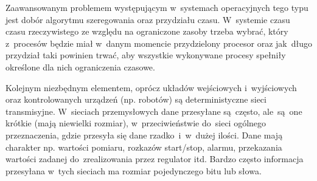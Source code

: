 Zaawansowanym problemem występującym w~systemach operacyjnych tego typu jest dobór algorytmu szeregowania oraz przydziału czasu. W~systemie czasu czasu rzeczywistego ze względu na ograniczone zasoby trzeba wybrać, który z~procesów będzie miał w~danym momencie przydzielony procesor oraz jak~długo przydział taki powinien trwać, aby wszystkie wykonywane procesy spełniły określone dla nich ograniczenia czasowe.


Kolejnym niezbędnym elementem, oprócz układów wejściowych i~wyjściowych oraz kontrolowanych urządzeń (np. robotów) są deterministyczne sieci transmisyjne.
W~sieciach przemysłowych dane przesyłane są~często, ale~są~one krótkie (mają niewielki rozmiar), w~przeciwieństwie do~sieci ogólnego przeznaczenia, gdzie przesyła się dane rzadko~i~w~dużej ilości. Dane mają charakter np. wartości
pomiaru, rozkazów start/stop, alarmu, przekazania wartości zadanej do~zrealizowania przez regulator itd. Bardzo często informacja przesyłana w~tych sieciach ma rozmiar pojedynczego bitu lub słowa.

